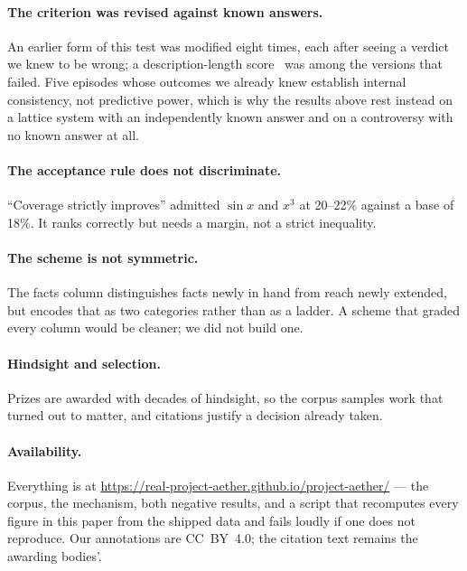 \documentclass[aps,pra,twocolumn,superscriptaddress,nofootinbib,10pt]{revtex4-2}
\begin{document}
\paragraph{The criterion was revised against known answers.} An earlier form of this test was
modified eight times, each after seeing a verdict we knew to be wrong; a description-length
score~\cite{rissanen1978mdl} was among the versions that failed. Five episodes whose
outcomes we already knew establish internal consistency, not predictive power, which is why the
results above rest instead on a lattice system with an independently known answer and on a
controversy with no known answer at all.

\paragraph{The acceptance rule does not discriminate.} ``Coverage strictly improves'' admitted
$\sin x$ and $x^{3}$ at 20--22\% against a base of 18\%. It ranks correctly but needs a margin,
not a strict inequality.

\paragraph{The scheme is not symmetric.} The facts column distinguishes facts newly in hand from
reach newly extended, but encodes that as two categories rather than as a ladder. A scheme that
graded every column would be cleaner; we did not build one.

\paragraph{Hindsight and selection.} Prizes are awarded with decades of hindsight, so the corpus
samples work that turned out to matter, and citations justify a decision already taken.

\paragraph{Availability.} Everything is at
\url{https://real-project-aether.github.io/project-aether/} --- the corpus, the mechanism, both
negative results, and a script that recomputes every figure in this paper from the shipped data
and fails loudly if one does not reproduce. Our annotations are CC~BY~4.0; the citation text
remains the awarding bodies'.



\end{document}

